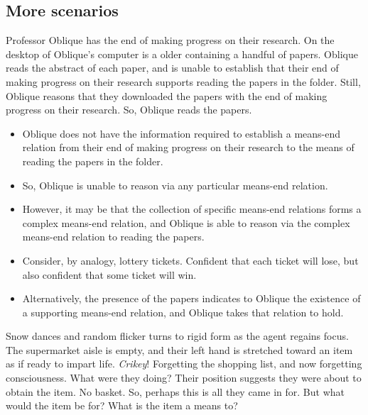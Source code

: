 \documentclass[10pt]{article}
\begin{document}
\subsection{More scenarios}
\label{sec:more-scenarios}


\begin{scenario}
  Professor Oblique has the end of making progress on their research.
  On the desktop of Oblique's computer is a older containing a handful of papers.
  Oblique reads the abstract of each paper, and is unable to establish that their end of making progress on their research supports reading the papers in the folder.
  Still, Oblique reasons that they downloaded the papers with the end of making progress on their research.
  So, Oblique reads the papers.
\end{scenario}

\begin{itemize}[noitemsep]
\item Oblique does not have the information required to establish a means-end relation from their end of making progress on their research to the means of reading the papers in the folder.
\item So, Oblique is unable to reason via any particular means-end relation.
\item However, it may be that the collection of specific means-end relations forms a complex means-end relation, and Oblique is able to reason via the complex means-end relation to reading the papers.
\item Consider, by analogy, lottery tickets.
  Confident that each ticket will lose, but also confident that some ticket will win.
\item Alternatively, the presence of the papers indicates to Oblique the existence of a supporting means-end relation, and Oblique takes that relation to hold.
\end{itemize}


\begin{scenario}
  Snow dances and random flicker turns to rigid form as the agent regains focus.
  The supermarket aisle is empty, and their left hand is stretched toward an item as if ready to impart life.
  \emph{Crikey}!
  Forgetting the shopping list, and now forgetting consciousness.
  What were they doing?
  Their position suggests they were about to obtain the item.
  No basket. So, perhaps this is all they came in for.
  But what would the item be for? What is the item a means to?
\end{scenario}
\end{document}
